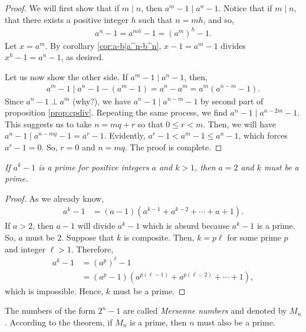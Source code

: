 \documentclass{subfile}
\begin{document}
	\begin{proof}
		We will first show that if $m\mid n$, then $a^m-1\mid a^n-1$. Notice that if $m\mid n$, that there exists a positive integer $h$ such that $n=mh$, and so,
		\begin{align*}
			a^n-1 = a^{mh}-1 = \left( a^m\right)^h -1.
		\end{align*}
		Let $x=a^m$. By corollary \eqref{cor:a-b|a^n-b^n}, $x-1=a^m-1$ divides $x^h-1=a^n-1$, as desired.

		Let us now show the other side. If $a^m-1\mid a^n-1$, then,
		\begin{align*}
			a^m-1\mid a^n-1-(a^m-1)=a^n-a^m=a^m(a^{n-m}-1).
		\end{align*}
		Since $a^n-1\perp a^m$ (why?), we have $a^n-1\mid a^{n-m}-1$ by second part of proposition \eqref{prop:cpdiv}. Repeating the same process, we find $a^n-1\mid a^{n-2m}-1$. This suggests us to take $n=mq+r$ so that $0\leq r<m$. Then, we will have $a^n-1\mid a^{n-mq}-1=a^r-1$. Evidently, $a^r-1<a^m-1\leq a^n-1$, which forces $a^r-1=0$. So, $r=0$ and $n=mq$. The proof is complete.
	\end{proof}

	\begin{theorem}\slshape
		\label{thm:a^k-1prime}
		If $a^k-1$ is a prime for positive integers $a$ and $k>1$, then $a=2$ and $k$ must be a prime.
	\end{theorem}

	\begin{proof}
		As we already know,
		\begin{align*}
			a^k-1 & = (a-1)(a^{k-1}+a^{k-2}+\cdots+a+1).
		\end{align*}
		If $a>2$, then $a-1$ will divide $a^k-1$ which is absurd because $a^k-1$ is a prime. So, $a$ must be $2$. Suppose that $k$ is composite. Then, $k=p\ell$ for some prime $p$ and integer $\ell>1$. Therefore,
		\begin{align*}
			a^k-1&=\left(a^p\right)^\ell -1\\
			&= (a^p-1)\left(a^{p(\ell-1)}+a^{p(\ell-2)}+\cdots+1\right),
		\end{align*}
		which is impossible. Hence, $k$ must be a prime.
	\end{proof}

	\begin{remark}
		The numbers of the form $2^n-1$ are called \textit{Mersenne numbers} and denoted by $M_n$. According to the theorem, if $M_n$ is a prime, then $n$ must also be a prime.
	\end{remark}
\end{document}
